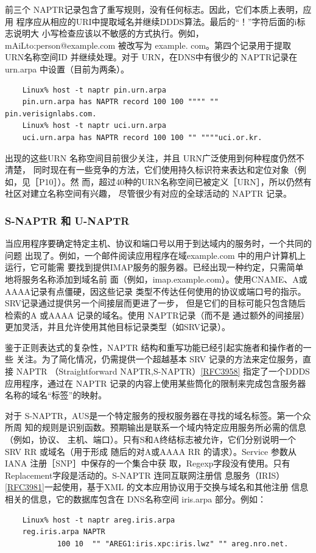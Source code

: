 前三个 NAPTR记录包含了重写规则，没有任何标志。因此，它们本质上表明，应用
程序应从相应的URI中提取域名并继续DDDS算法。最后的“！”字符后面的i标志说明大
小写检查应该以不敏感的方式执行。例如，mAiLto:person@example.com 被改写为 example.
com。第四个记录用于提取 URN名称空间ID 并继续处理。对于 URN，在DNS中有很少的
NAPTR记录在 urn.arpa 中设置（目前为两条）。

\begin{verbatim}
    Linux% host -t naptr pin.urn.arpa
    pin.urn.arpa has NAPTR record 100 100 """" "" pin.verisignlabs.com.
    Linux% host -t naptr uci.urn.arpa
    uci.urn.arpa has NAPTR record 100 100 "" """"uci.or.kr.
\end{verbatim}

出现的这些URN 名称空间目前很少关注，并且 URN广泛使用到何种程度仍然不清楚，
同时现在有一些竞争的方法，它们使用持久标识符来表达和定位对象（例如，见［P10］）。然
而，超过40种的URN名称空间已被定义［URN］，所以仍然有社区对建立名称空间有兴趣，
尽管很少有对应的全球活动的 NAPTR 记录。

\subsubsection{S-NAPTR 和 U-NAPTR}

当应用程序要确定特定主机、协议和端口号以用于到达域内的服务时，一个共同的问题
出现了。例如，一个邮件阅读应用程序在域example.com 中的用户计算机上运行，它可能需
要找到提供IMAP服务的服务器。已经出现一种约定，只需简单地将服务名称添加到域名前
面（例如，imap.example.com）。使用CNAME、A或AAAA记录有点僵硬，因这些记录
类型不传达任何使用的协议或端口号的指示。SRV记录通过提供另一个间接层而更进了一步，
但是它们的目标可能只包含随后检索的A 或AAAA 记录的域名。使用 NAPTR记录（而不是
通过额外的间接层）更加灵活，并且允许使用其他目标记录类型（如SRV记录）。

鉴于正则表达式的复杂性，NAPTR 结构和重写功能已经引起实施者和操作者的一些
关注。为了简化情况，仍需提供一个超越基本 SRV 记录的方法来定位服务，直接 NAPTR
（Straightforward NAPTR,S-NAPTR）\href{https://www.rfc-editor.org/rfc/rfc3958}{[RFC3958]} 指定了一个DDDS应用程序，通过在
NAPTR 记录的内容上使用某些筒化的限制来完成包含服务器名称的域名“标签”的映射。

对于 S-NAPTR，AUS是一个特定服务的授权服务器在寻找的域名标签。第一个众所周
知的规则是识别函数。预期输出是联系一个域内特定应用服务所必需的信息（例如，协议、
主机、端口）。只有S和A终结标志被允许，它们分别说明一个 SRV RR 或域名（用于形成
随后的对A或AAAA RR 的请求）。Service 参数从IANA 注册［SNP］中保存的一个集合中获
取，Regexp字段没有使用。只有 Replacement字段是活动的。S-NAPTR 连同互联网注册信
息服务（IRIS）\href{https://www.rfc-editor.org/rfc/rfc3981}{[RFC3981]}一起使用，基于XML 的文本应用协议用于交换与域名和其他注册
信息相关的信息，它的数据库包含在 DNS名称空间 iris.arpa 部分。例如：
\begin{verbatim}
    Linux% host -t naptr areg.iris.arpa
    reg.iris.arpa NAPTR
            100 10  "" "AREG1:iris.xpc:iris.lwz" "" areg.nro.net.
\end{verbatim}

